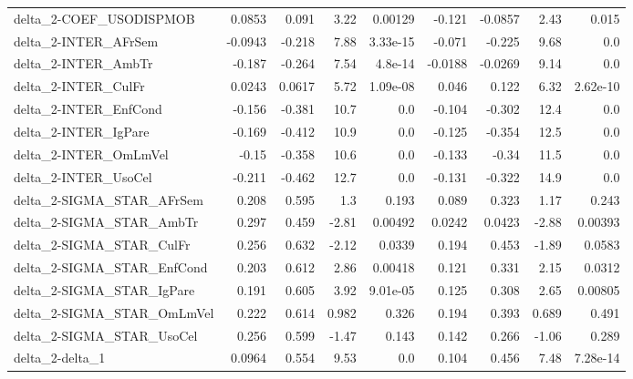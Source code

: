 \begin{tabular}{lrrrrrrrr}
delta\_2-COEF\_USODISPMOB               &      0.0853 &        0.091 &     3.22 &  0.00129 &     -0.121 &     -0.0857 &         2.43 &         0.015 \\
delta\_2-INTER\_AFrSem                  &     -0.0943 &       -0.218 &     7.88 & 3.33e-15 &     -0.071 &      -0.225 &         9.68 &           0.0 \\
delta\_2-INTER\_AmbTr                   &      -0.187 &       -0.264 &     7.54 &  4.8e-14 &    -0.0188 &     -0.0269 &         9.14 &           0.0 \\
delta\_2-INTER\_CulFr                   &      0.0243 &       0.0617 &     5.72 & 1.09e-08 &      0.046 &       0.122 &         6.32 &      2.62e-10 \\
delta\_2-INTER\_EnfCond                 &      -0.156 &       -0.381 &     10.7 &      0.0 &     -0.104 &      -0.302 &         12.4 &           0.0 \\
delta\_2-INTER\_IgPare                  &      -0.169 &       -0.412 &     10.9 &      0.0 &     -0.125 &      -0.354 &         12.5 &           0.0 \\
delta\_2-INTER\_OmLmVel                 &       -0.15 &       -0.358 &     10.6 &      0.0 &     -0.133 &       -0.34 &         11.5 &           0.0 \\
delta\_2-INTER\_UsoCel                  &      -0.211 &       -0.462 &     12.7 &      0.0 &     -0.131 &      -0.322 &         14.9 &           0.0 \\
delta\_2-SIGMA\_STAR\_AFrSem             &       0.208 &        0.595 &      1.3 &    0.193 &      0.089 &       0.323 &         1.17 &         0.243 \\
delta\_2-SIGMA\_STAR\_AmbTr              &       0.297 &        0.459 &    -2.81 &  0.00492 &     0.0242 &      0.0423 &        -2.88 &       0.00393 \\
delta\_2-SIGMA\_STAR\_CulFr              &       0.256 &        0.632 &    -2.12 &   0.0339 &      0.194 &       0.453 &        -1.89 &        0.0583 \\
delta\_2-SIGMA\_STAR\_EnfCond            &       0.203 &        0.612 &     2.86 &  0.00418 &      0.121 &       0.331 &         2.15 &        0.0312 \\
delta\_2-SIGMA\_STAR\_IgPare             &       0.191 &        0.605 &     3.92 & 9.01e-05 &      0.125 &       0.308 &         2.65 &       0.00805 \\
delta\_2-SIGMA\_STAR\_OmLmVel            &       0.222 &        0.614 &    0.982 &    0.326 &      0.194 &       0.393 &        0.689 &         0.491 \\
delta\_2-SIGMA\_STAR\_UsoCel             &       0.256 &        0.599 &    -1.47 &    0.143 &      0.142 &       0.266 &        -1.06 &         0.289 \\
delta\_2-delta\_1                       &      0.0964 &        0.554 &     9.53 &      0.0 &      0.104 &       0.456 &         7.48 &      7.28e-14 \\
\bottomrule
\end{tabular}
